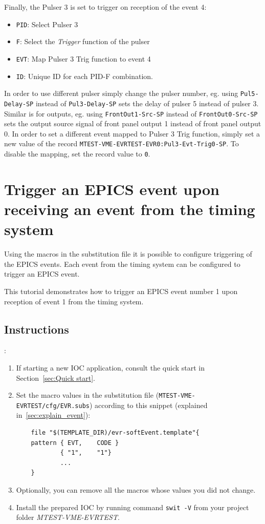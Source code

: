 \documentclass[12pt,a4paper]{article}
\begin{document}
Finally, the Pulser 3 is set to trigger on reception of the event 4:
\begin{itemize}
	\item \texttt{PID}: Select Pulser 3
	\item \texttt{F}: Select the \textit{Trigger} function of the pulser
	\item \texttt{EVT}: Map Pulser 3 Trig function to event 4
	\item \texttt{ID}: Unique ID for each PID-F combination.
\end{itemize}

In order to use different pulser simply change the pulser number, eg. using \texttt{Pul5-Delay-SP} instead of \texttt{Pul3-Delay-SP} sets the delay of pulser 5 instead of pulser 3.
Similar is for outputs, eg. using \texttt{FrontOut1-Src-SP} instead of \texttt{FrontOut0-Src-SP} sets the output source signal of front panel output 1 instead of front panel output 0. In order to set a different event mapped to Pulser 3 Trig function, simply set a new value of the record \texttt{MTEST-VME-EVRTEST-EVR0:Pul3-Evt-Trig0-SP}. To disable the mapping, set the record value to \texttt{0}.

\section{Trigger an EPICS event upon receiving an event from the timing system}
Using the macros in the substitution file it is possible to configure triggering of the EPICS events. Each event from the timing system can be configured to trigger an EPICS event.

This tutorial demonstrates how to trigger an EPICS event number 1 upon reception of event 1 from the timing system.

\subsection{Instructions}:
\begin{enumerate}
	\item If starting a new IOC application, consult the quick start in Section~\ref{sec:Quick start}.
	
	\item Set the macro values in the substitution file (\texttt{MTEST-VME-EVRTEST/cfg/EVR.subs}) according to this snippet (explained in~\ref{sec:explain_event}):
\begin{verbatim}
	file "$(TEMPLATE_DIR)/evr-softEvent.template"{
	pattern { EVT,    CODE }
	        { "1",    "1"}
	        ...
	}
\end{verbatim}
	\item Optionally, you can remove all the macros whose values you did not change. 

	\item Install the prepared IOC by running command \texttt{swit -V} from your project folder \textit{MTEST-VME-EVRTEST}.
\end{enumerate}
\end{document}
